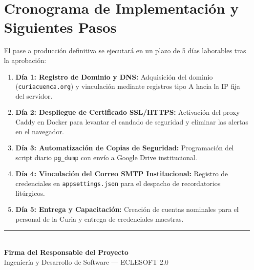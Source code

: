 \documentclass[11pt,a4paper]{article}
\begin{document}
\section{Cronograma de Implementación y Siguientes Pasos}

El pase a producción definitiva se ejecutará en un plazo de 5 días laborables tras la aprobación:

\begin{enumerate}[leftmargin=1.2cm]
    \item \textbf{Día 1: Registro de Dominio y DNS:} Adquisición del dominio (\texttt{curiacuenca.org}) y vinculación mediante registros tipo A hacia la IP fija del servidor.
    \item \textbf{Día 2: Despliegue de Certificado SSL/HTTPS:} Activación del proxy Caddy en Docker para levantar el candado de seguridad y eliminar las alertas en el navegador.
    \item \textbf{Día 3: Automatización de Copias de Seguridad:} Programación del script diario \texttt{pg\_dump} con envío a Google Drive institucional.
    \item \textbf{Día 4: Vinculación del Correo SMTP Institucional:} Registro de credenciales en \texttt{appsettings.json} para el despacho de recordatorios litúrgicos.
    \item \textbf{Día 5: Entrega y Capacitación:} Creación de cuentas nominales para el personal de la Curia y entrega de credenciales maestras.
\end{enumerate}

\vspace{0.8cm}
\begin{center}
    \rule{8cm}{0.6pt}\\
    \vspace{0.2cm}
    \textbf{Firma del Responsable del Proyecto}\\
    Ingeniería y Desarrollo de Software --- ECLESOFT 2.0
\end{center}
\end{document}
